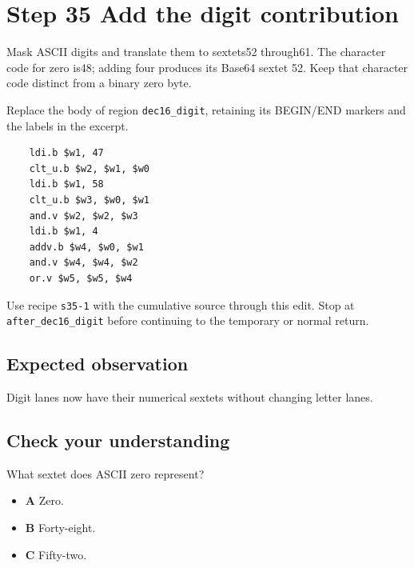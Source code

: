 \section{Step 35 Add the digit contribution}\label{base64-s35}

Mask ASCII digits and translate them to sextets52 through61. The character code for zero is48; adding four produces its Base64 sextet 52. Keep that character code distinct from a binary zero byte.

Replace the body of region \texttt{dec16\_digit}, retaining its BEGIN/END markers and the labels in the excerpt.

\begin{verbatim}
    ldi.b $w1, 47
    clt_u.b $w2, $w1, $w0
    ldi.b $w1, 58
    clt_u.b $w3, $w0, $w1
    and.v $w2, $w2, $w3
    ldi.b $w1, 4
    addv.b $w4, $w0, $w1
    and.v $w4, $w4, $w2
    or.v $w5, $w5, $w4
\end{verbatim}

Use recipe \texttt{s35-1} with the cumulative source through this edit. Stop at \texttt{after\_dec16\_digit} before continuing to the temporary or normal return.

\subsection{Expected observation}
Digit lanes now have their numerical sextets without changing letter lanes.

\subsection{Check your understanding}
What sextet does ASCII zero represent?

\begin{itemize}
  \item \textbf{A} Zero.
  \item \textbf{B} Forty-eight.
  \item \textbf{C} Fifty-two.
\end{itemize}
